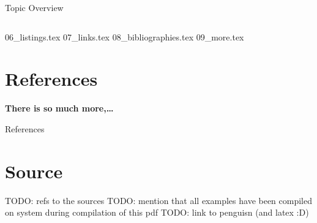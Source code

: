 



\begin{frame}{Topic Overview}
\begin{columns}[c,onlytextwidth]
\tableofcontents[sections={1-4}]
\tableofcontents[sections={5-8}]
\end{columns}
\end{frame}

{06_listings.tex}
{07_links.tex}
{08_bibliographies.tex}
{09_more.tex}

\appendix
\beginbackup

\section{References}

\begin{frame}[plain,c]{}
   \vspace*{4em}\centering\Large\bfseries There is so much more,\ldots
\end{frame}

\begin{frame}[allowframebreaks]{References}
\printbibliography
\end{frame}


\section{Source}
\begin{frame}
   TODO: refs to the sources
   TODO: mention that all examples have been compiled on system during compilation of this pdf
   TODO: link to penguisn (and latex :D)
\end{frame}
\backupend


